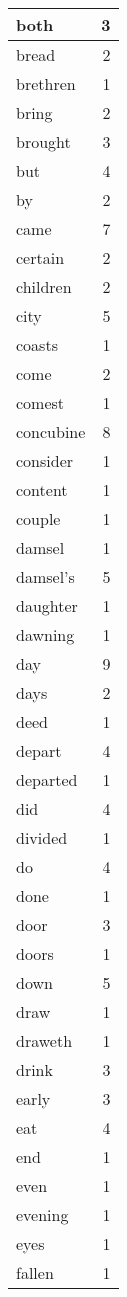 \begin{center}
\begin{longtable}{l|r}
both & 3 \\ \hline
bread & 2 \\ \hline
brethren & 1 \\ \hline
bring & 2 \\ \hline
brought & 3 \\ \hline
but & 4 \\ \hline
by & 2 \\ \hline
came & 7 \\ \hline
certain & 2 \\ \hline
children & 2 \\ \hline
city & 5 \\ \hline
coasts & 1 \\ \hline
come & 2 \\ \hline
comest & 1 \\ \hline
concubine & 8 \\ \hline
consider & 1 \\ \hline
content & 1 \\ \hline
couple & 1 \\ \hline
damsel & 1 \\ \hline
damsel's & 5 \\ \hline
daughter & 1 \\ \hline
dawning & 1 \\ \hline
day & 9 \\ \hline
days & 2 \\ \hline
deed & 1 \\ \hline
depart & 4 \\ \hline
departed & 1 \\ \hline
did & 4 \\ \hline
divided & 1 \\ \hline
do & 4 \\ \hline
done & 1 \\ \hline
door & 3 \\ \hline
doors & 1 \\ \hline
down & 5 \\ \hline
draw & 1 \\ \hline
draweth & 1 \\ \hline
drink & 3 \\ \hline
early & 3 \\ \hline
eat & 4 \\ \hline
end & 1 \\ \hline
even & 1 \\ \hline
evening & 1 \\ \hline
eyes & 1 \\ \hline
fallen & 1 \\ \hline

\end{longtable}
\end{center}
